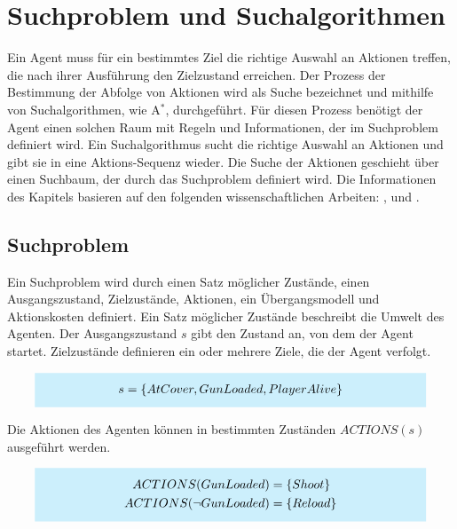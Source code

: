 \newcommand{\highlightbox}[2]{%
    \colorbox{cyan!20}{%
        \parbox{#1}{\vspace{0.5em}\centering #2\vspace{0.5em}}%
    }%
}


\chapter{Suchproblem und Suchalgorithmen}
\label{chap:suchproblem und suchalgorithmen}

Ein Agent muss für ein bestimmtes Ziel die richtige Auswahl an Aktionen treffen, die nach ihrer Ausführung den Zielzustand erreichen. Der Prozess der Bestimmung der Abfolge von Aktionen wird als Suche bezeichnet und mithilfe von Suchalgorithmen, wie A$^*$, durchgeführt. Für diesen Prozess benötigt der Agent einen solchen Raum mit Regeln und Informationen, der im Suchproblem definiert wird. Ein Suchalgorithmus sucht die richtige Auswahl an Aktionen und gibt sie in eine Aktions-Sequenz wieder. Die Suche der Aktionen geschieht über einen Suchbaum, der durch das Suchproblem definiert wird. Die Informationen des Kapitels basieren auf den folgenden wissenschaftlichen Arbeiten: \autocite{RN2020}, \autocite{4082128} und \autocite{Felner2011}.

\section{Suchproblem}
\label{chap:suchproblem}

Ein Suchproblem wird durch einen Satz möglicher Zustände, einen Ausgangszustand, Zielzustände, Aktionen, ein Übergangsmodell und Aktionskosten definiert. Ein Satz möglicher Zustände beschreibt die Umwelt des Agenten. Der Ausgangszustand $s$ gibt den Zustand an, von dem der Agent startet. Zielzustände definieren ein oder mehrere Ziele, die der Agent verfolgt.

\[
\highlightbox{0.9\textwidth}{$
    \begin{aligned}
			s = \{AtCover, GunLoaded, PlayerAlive\}
    \end{aligned}
$}
\]

Die Aktionen des Agenten können in bestimmten Zuständen $ACTIONS(s)$ ausgeführt werden.

\[
\highlightbox{0.9\textwidth}{$
    \begin{aligned}
			ACTIONS(GunLoaded) &= \{Shoot\} \\
			ACTIONS(\lnot GunLoaded) &= \{Reload\}
    \end{aligned}
$}
\]

